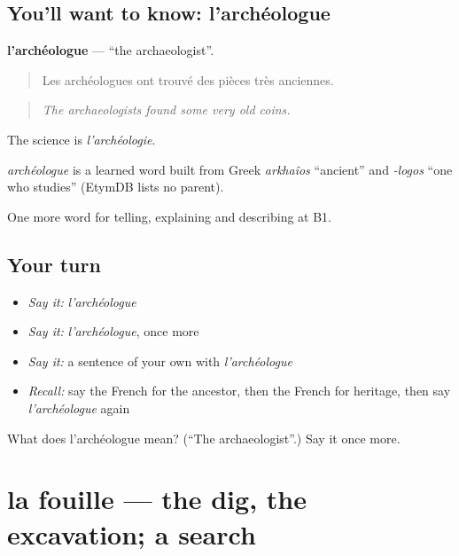 \subsection*{You'll want to know: l'archéologue}
\textbf{l'archéologue} — \textquotedblleft{}the archaeologist\textquotedblright{}.

\begin{quote}
Les archéologues ont trouvé des pièces très anciennes.
\end{quote}

\begin{quote}
\emph{The archaeologists found some very old coins.}
\end{quote}

The science is \emph{l'archéologie}.

\begin{cousinweb}
\emph{archéologue} is a learned word built from Greek \emph{arkhaîos} \textquotedblleft{}ancient\textquotedblright{} and \emph{-logos} \textquotedblleft{}one who studies\textquotedblright{} (EtymDB lists no parent).
\end{cousinweb}

\begin{grammarlens}[title={What you've built}]
One more word for telling, explaining and describing at B1.
\end{grammarlens}

\subsection*{Your turn}
\begin{itemize}
\raggedright
  \item \emph{Say it:} \emph{l'archéologue}
  \item \emph{Say it:} \emph{l'archéologue}, once more
  \item \emph{Say it:} a sentence of your own with \emph{l'archéologue}
  \item \emph{Recall:} say the French for the ancestor, then the French for heritage, then say \emph{l'archéologue} again
\end{itemize}

\begin{tcolorbox}[breakable,colback=teal!4,colframe=teal!35!black,title={Before you move on}]
What does l'archéologue mean? (\textquotedblleft{}The archaeologist\textquotedblright{}.) Say it once more.
\end{tcolorbox}
\section[la fouille]{la fouille — the dig, the excavation; a search}

